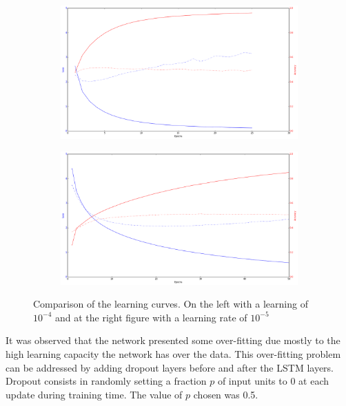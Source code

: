 \begin{figure}[H]
\centering
\begin{subfigure}[b]{.5\textwidth}
  \centering
  \includegraphics[width=1\linewidth]{img/methodology/training_bad}
\end{subfigure}%
\begin{subfigure}[b]{.5\textwidth}
  \centering
  \includegraphics[width=1\linewidth]{img/methodology/training_good}
\end{subfigure}
\caption{Comparison of the learning curves. On the left with a learning of $10^{-4}$ and at the right figure with a learning rate of $10^{-5}$}
\label{fig:training_curves_comparison}
\end{figure}

It was observed that the network presented some over-fitting due mostly to the high learning capacity the network has over the data. %
This over-fitting problem can be addressed by adding dropout\cite{srivastava2014dropout} layers before and after the LSTM layers. Dropout consists in randomly setting a fraction $p$ of input units to 0 at each update during training time. The value of $p$ chosen was 0.5.

